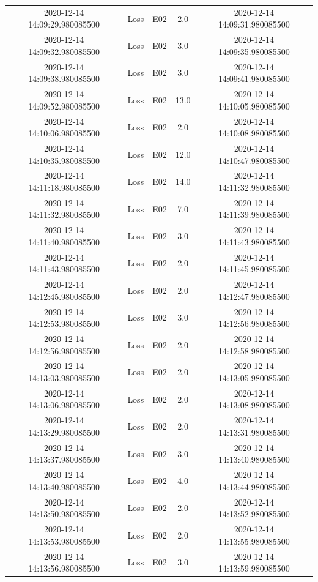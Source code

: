 \begin{enumerate}
\begin{longtabu}{ccccc}
2020{-}12{-}14 14:09:29.980085500&Loss&E02&2.0&2020{-}12{-}14 14:09:31.980085500\\%
2020{-}12{-}14 14:09:32.980085500&Loss&E02&3.0&2020{-}12{-}14 14:09:35.980085500\\%
2020{-}12{-}14 14:09:38.980085500&Loss&E02&3.0&2020{-}12{-}14 14:09:41.980085500\\%
2020{-}12{-}14 14:09:52.980085500&Loss&E02&13.0&2020{-}12{-}14 14:10:05.980085500\\%
2020{-}12{-}14 14:10:06.980085500&Loss&E02&2.0&2020{-}12{-}14 14:10:08.980085500\\%
2020{-}12{-}14 14:10:35.980085500&Loss&E02&12.0&2020{-}12{-}14 14:10:47.980085500\\%
2020{-}12{-}14 14:11:18.980085500&Loss&E02&14.0&2020{-}12{-}14 14:11:32.980085500\\%
2020{-}12{-}14 14:11:32.980085500&Loss&E02&7.0&2020{-}12{-}14 14:11:39.980085500\\%
2020{-}12{-}14 14:11:40.980085500&Loss&E02&3.0&2020{-}12{-}14 14:11:43.980085500\\%
2020{-}12{-}14 14:11:43.980085500&Loss&E02&2.0&2020{-}12{-}14 14:11:45.980085500\\%
2020{-}12{-}14 14:12:45.980085500&Loss&E02&2.0&2020{-}12{-}14 14:12:47.980085500\\%
2020{-}12{-}14 14:12:53.980085500&Loss&E02&3.0&2020{-}12{-}14 14:12:56.980085500\\%
2020{-}12{-}14 14:12:56.980085500&Loss&E02&2.0&2020{-}12{-}14 14:12:58.980085500\\%
2020{-}12{-}14 14:13:03.980085500&Loss&E02&2.0&2020{-}12{-}14 14:13:05.980085500\\%
2020{-}12{-}14 14:13:06.980085500&Loss&E02&2.0&2020{-}12{-}14 14:13:08.980085500\\%
2020{-}12{-}14 14:13:29.980085500&Loss&E02&2.0&2020{-}12{-}14 14:13:31.980085500\\%
2020{-}12{-}14 14:13:37.980085500&Loss&E02&3.0&2020{-}12{-}14 14:13:40.980085500\\%
2020{-}12{-}14 14:13:40.980085500&Loss&E02&4.0&2020{-}12{-}14 14:13:44.980085500\\%
2020{-}12{-}14 14:13:50.980085500&Loss&E02&2.0&2020{-}12{-}14 14:13:52.980085500\\%
2020{-}12{-}14 14:13:53.980085500&Loss&E02&2.0&2020{-}12{-}14 14:13:55.980085500\\%
2020{-}12{-}14 14:13:56.980085500&Loss&E02&3.0&2020{-}12{-}14 14:13:59.980085500\\%

\end{longtabu}
\end{enumerate}
